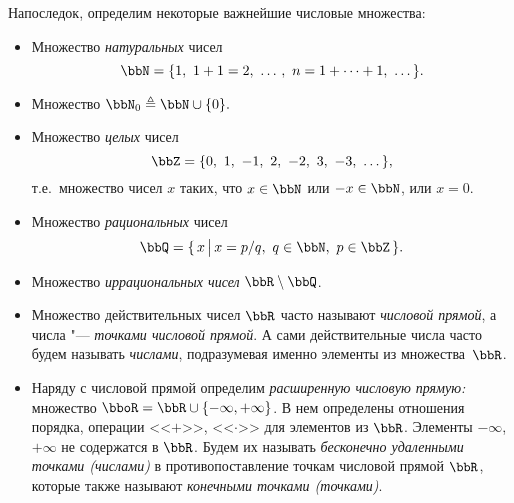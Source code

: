 Напоследок, определим некоторые важнейшие числовые множества:
\begin{defn}\leavevmode
\begin{itemize}[wide, labelwidth=!, labelindent=0pt, nolistsep, topsep=0pt]
\item 
Множество \textit{натуральных} чисел $$\bbN = \{1,\ 1+1=2,\ \dots\,,\ n = 1+\dots+1,\ \dots\,\}.$$
\item 
Множество $\bbN_0 \triangleq \bbN \cup \{0\}.$
\item 
Множество \textit{целых} чисел $$\bbZ = \{ 0,\ 1,\ -1,\ 2,\ -2,\ 3,\ -3,\ \dots\,\},$$ т.е.\ множество чисел $x$ таких, что $x\in \bbN$ или $-x \in \bbN$, или $x = 0$.
\item
Множество \textit{рациональных} чисел $$\bbQ=\{\,x\,\big|\,x=p/q,\ q\in\bbN,\ p\in\bbZ\,\}.$$
\item 
Множество \textit{иррациональных чисел} $\bbR \setminus \bbQ$.
\item 
Множество действительных чисел $\bbR$ часто называют \textit{числовой прямой}, а числа "--- \textit{точками числовой прямой}. А сами действительные числа часто будем называть \textit{числами}, подразумевая именно элементы из множества~$\bbR$.
\item 
Наряду с числовой прямой определим \textit{расширенную числовую прямую:} множество $\bboR=\bbR\cup \{-\infty, {+\infty}\}$. В нем определены отношения порядка, операции <<$+$>>, <<$\cdot$>> для элементов из $\bbR$. Элементы $-\infty$, $+\infty$ не содержатся в $\bbR$. Будем их называть \textit{бесконечно удаленными точками (числами)} в противопоставление точкам числовой прямой $\bbR$, которые также называют \textit{конечными точками (точками)}. 


\end{itemize}
\end{defn}
